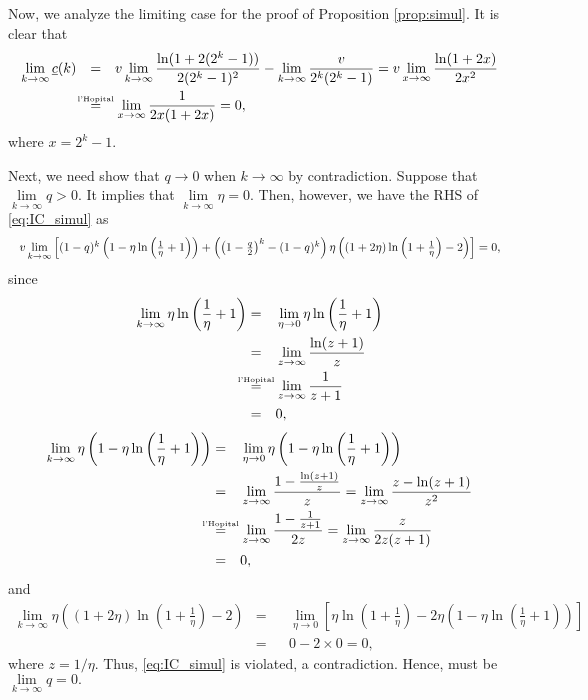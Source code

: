 \documentclass[12pt]{article}
\newcommand*{\Resize}
[2]{\resizebox{\textwidth}{!}{$#2$}}
\newcommand\myeq{\mathrel{\stackrel{\makebox[0pt]{\mbox{\normalfont\tiny
					l'Hopital}}}{=}}}
\begin{document}
Now, we analyze the limiting case for the proof of Proposition 
\ref{prop:simul}.  It is clear that 
\begin{equation*}
\begin{aligned}
\lim\limits_{k \to \infty} \underline{c}(k) &&=&&& v 
\lim\limits_{k \to \infty} \frac{\ln(1+2(2^k-1))}{2(2^k-1)^2} - \lim\limits_{k 
\to \infty} \frac{v}{2^k(2^k-1)} = v\lim\limits_{x \to \infty} 
\frac{\ln(1+2x)}{2x^2}\\
&& \myeq&&& \lim\limits_{x \to \infty} \frac{1}{2x(1+2x)}=0,
\end{aligned}
\end{equation*}
where $x = 2^k-1$. 


Next, we need show that $q \to 0$ when $k \to \infty$ by contradiction.  
Suppose that $\lim\limits_{k \to \infty}q >0$.  It implies that $\lim\limits_{k 
\to \infty}\eta = 0$.   Then, however, we have the RHS of \eqref{eq:IC_simul} as
\begin{equation*}
\Resize{}{
v\lim\limits_{k \to \infty}\left[(1-q)^k\left(1 - \eta 
\ln\left(\frac{1}{\eta}+1\right)\right) + \left(\left(1-\frac{q}{2}\right)^k 
-(1-q)^k\right)\eta\left((1+2\eta)\ln\left(1+\frac{1}{\eta}\right) 
-2\right)\right]=0,
}
\end{equation*}
since
\begin{equation*}
\begin{aligned}
\lim\limits_{k\to\infty}\eta\ln\left(\frac{1}{\eta}+1\right) &=&& 
\lim\limits_{\eta\to 0}\eta\ln\left(\frac{1}{\eta}+1\right)\\
&=&&\lim\limits_{z\to \infty}\frac{\ln(z+1)}{z}\\
&\myeq && \lim\limits_{z\to \infty}\frac{1}{z+1}\\
& = && 0,
\end{aligned}
\end{equation*}
\begin{equation*}
\begin{aligned}
\lim\limits_{k\to\infty}\eta\left(1 - 
\eta\ln\left(\frac{1}{\eta}+1\right)\right) &=&& 
\lim\limits_{\eta\to 0}\eta\left(1 - 
\eta\ln\left(\frac{1}{\eta}+1\right)\right)\\
&=&&\lim\limits_{z\to \infty}\frac{1 - \frac{\ln(z+1)}{z}}{z} = 
\lim\limits_{z\to \infty}\frac{z - \ln(z+1)}{z^2}\\
&\myeq && \lim\limits_{z\to \infty}\frac{1 - \frac{1}{z+1}}{2z} = 
\lim\limits_{z\to 
\infty}\frac{z}{2z(z+1)}\\
& = && 0,
\end{aligned}
\end{equation*}
and
\begin{equation*}
\begin{aligned}
\lim\limits_{k\to\infty}\eta\left((1+2\eta)\ln\left(1+\frac{1}{\eta}\right) 
-2\right) &=&& 
\lim\limits_{\eta\to 0}\left[\eta\ln\left(1+\frac{1}{\eta}\right) - 2 
\eta\left(1 - \eta\ln\left(\frac{1}{\eta}+1\right)\right)\right]\\
&=&&0 - 2\times 0 = 0,
\end{aligned}
\end{equation*}
where $z = 1/\eta$.  Thus, \eqref{eq:IC_simul} is violated, a contradiction.  
Hence, must be $\lim\limits_{k \to \infty}q=0.$
\end{document}
